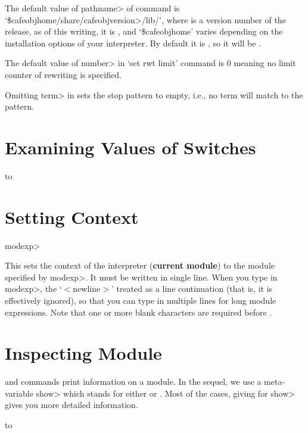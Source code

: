 The default value of \<pathname> of  command is
`\$cafeobjhome/share/cafeobj\<version>/lib/', 
where  is a version number of the release,
as of this writing, it is , 
and `\$cafeobjhome' varies depending on the installation options
of your interpreter. 
By default it is , so 
it will be .

The default value of \<number> in `set rwt limit' command is 0 meaning
no limit counter of rewriting is specified.

Omitting \<term> in  sets the stop pattern to
empty, i.e., no term will match to the pattern.

\section{Examining Values of Switches}

\paralign to 
\section{Setting Context}

 {\<modexp>}

This sets the context of the interpreter ({\bf current module})
to the module specified by \<modexp>.
It must be written in single line. 
When you type in \<modexp>, the `\kbd{;}$<$newline$>$' treated as a
line continuation (that is, it is effectively ignored), so that you
can type in multiple lines for long module expressions. Note that one
or more blank characters are required before \kbd{;}.

\section{Inspecting Module}

 and  commands print information on a module. 
In the sequel, we use a meta-variable \<show> which stands for
either  or . Most of the cases, 
giving  for \<show> gives you more detailed
information. 

\paralign to 


